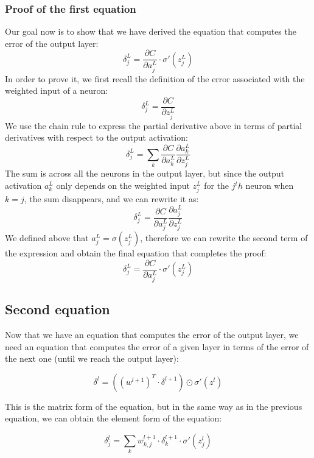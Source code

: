 \documentclass[../main]{subfiles}
\begin{document}
\subsubsection{Proof of the first equation}
Our goal now is to show that we have derived the equation that computes the error of the output layer:
\begin{equation*}
\delta_{j}^L = \frac{\partial C}{\partial a_{j}^L} \cdot \sigma'(z_{j}^L)
\end{equation*}
In order to prove it, we first recall the definition of the error associated with the weighted input of a neuron:
\begin{equation*}
\delta_{j}^L = \frac{\partial C}{\partial z_{j}^L}
\end{equation*}
We use the chain rule to express the partial derivative above in terms of partial derivatives with respect to the output activation:
\begin{equation*}
    \delta_{j}^L = \sum_k \frac{\partial C}{\partial a_{k}^L} \frac{\partial a_{k}^L}{\partial z_{j}^L}
\end{equation*}
The sum is across all the neurons in the output layer, but since the output activation \(a_{k}^L\) only depends on the weighted input \(z_{j}^L\) for the $j^th$ neuron when \(k = j\), the sum disappears, and we can rewrite it as:
\begin{equation*}
    \delta_{j}^L = \frac{\partial C}{\partial a_{j}^L} \frac{\partial a_{j}^L}{\partial z_{j}^L}
\end{equation*}
We defined above that \(a_{j}^L = \sigma(z_{j}^L)\), therefore we can rewrite the second term of the expression and obtain the final equation that completes the proof:
\begin{equation*}
    \delta_{j}^L = \frac{\partial C}{\partial a_{j}^L} \cdot \sigma'(z_{j}^L)
\end{equation*}
\subsection{Second equation}
Now that we have an equation that computes the error of the output layer, we need an equation that computes the error of a given layer in terms of the error of the next one (until we reach the output layer):\vspace{6mm}
\begin{mdframed}[style=myequationstyle]
\begin{equation*}
    \delta^l = \left((w^{l+1})^T \cdot \delta^{l+1}\right) \odot \sigma'(z^l)
\end{equation*}
\end{mdframed}\vspace{4mm}
This is the matrix form of the equation, but in the same way as in the previous equation, we can obtain the element form of the equation:\vspace{6mm}
\begin{mdframed}[style=myequationstyle]
\begin{equation*}
    \delta_{j}^l = \sum_{k} w_{k,j}^{l+1} \cdot \delta_{k}^{l+1} \cdot \sigma'(z_{j}^l)
\end{equation*}
\end{mdframed}
\end{document}
